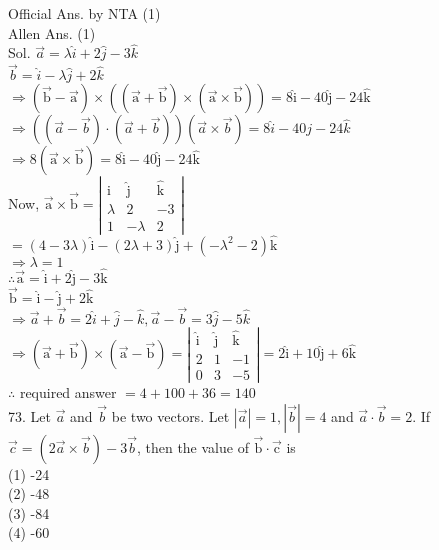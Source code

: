 \documentclass[10pt]{article}
\begin{document}
Official Ans. by NTA (1)\\
Allen Ans. (1)\\
Sol. \(\vec{a}=\lambda \hat{i}+2 \hat{j}-3 \hat{k}\)\\
\(\vec{b}=\hat{i}-\lambda \hat{j}+2 \hat{k}\)\\
\(\Rightarrow(\overrightarrow{\mathrm{b}}-\overrightarrow{\mathrm{a}}) \times((\overrightarrow{\mathrm{a}}+\overrightarrow{\mathrm{b}}) \times(\overrightarrow{\mathrm{a}} \times \overrightarrow{\mathrm{b}}))=8 \hat{\mathrm{i}}-40 \hat{\mathrm{j}}-24 \hat{\mathrm{k}}\)\\
\(\Rightarrow((\vec{a}-\vec{b}) \cdot(\vec{a}+\vec{b}))(\vec{a} \times \vec{b})=8 \hat{i}-40 j-24 \hat{k}\)\\
\(\Rightarrow 8(\overrightarrow{\mathrm{a}} \times \overrightarrow{\mathrm{b}})=8 \hat{\mathrm{i}}-40 \hat{\mathrm{j}}-24 \hat{\mathrm{k}}\)\\
Now, \(\overrightarrow{\mathrm{a}} \times \overrightarrow{\mathrm{b}}=\left|\begin{array}{ccc}\hat{\mathrm{i}} & \hat{\mathrm{j}} & \hat{\mathrm{k}} \\ \lambda & 2 & -3 \\ 1 & -\lambda & 2\end{array}\right|\)\\
\(=(4-3 \lambda) \hat{\mathrm{i}}-(2 \lambda+3) \hat{\mathrm{j}}+\left(-\lambda^{2}-2\right) \hat{\mathrm{k}}\)\\
\(\Rightarrow \lambda=1\)\\
\(\therefore \overrightarrow{\mathrm{a}}=\hat{\mathrm{i}}+2 \hat{\mathrm{j}}-3 \hat{\mathrm{k}}\)\\
\(\overrightarrow{\mathrm{b}}=\hat{\mathrm{i}}-\hat{\mathrm{j}}+2 \hat{\mathrm{k}}\)\\
\(\Rightarrow \vec{a}+\vec{b}=2 \hat{i}+\hat{j}-\hat{k}, \vec{a}-\vec{b}=3 \hat{j}-5 \hat{k}\)\\
\(\Rightarrow(\overrightarrow{\mathrm{a}}+\overrightarrow{\mathrm{b}}) \times(\overrightarrow{\mathrm{a}}-\overrightarrow{\mathrm{b}})=\left|\begin{array}{ccc}\hat{\mathrm{i}} & \hat{\mathrm{j}} & \hat{\mathrm{k}} \\ 2 & 1 & -1 \\ 0 & 3 & -5\end{array}\right|=2 \hat{\mathrm{i}}+10 \hat{\mathrm{j}}+6 \hat{\mathrm{k}}\)\\
\(\therefore\) required answer \(=4+100+36=140\)\\
73. Let \(\vec{a}\) and \(\vec{b}\) be two vectors. Let \(|\vec{a}|=1,|\vec{b}|=4\) and \(\vec{a} \cdot \vec{b}=2\). If \(\vec{c}=(2 \vec{a} \times \vec{b})-3 \vec{b}\), then the value of \(\overrightarrow{\mathrm{b}} \cdot \overrightarrow{\mathrm{c}}\) is\\
(1) -24\\
(2) -48\\
(3) -84\\
(4) -60
\end{document}
